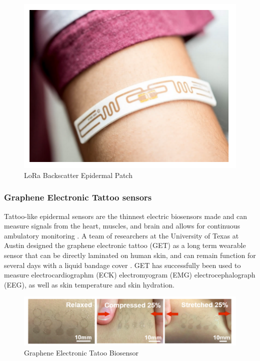 \documentclass[sigconf]{acmart}
\begin{document}
\begin{figure}[!ht]
  \centering\includegraphics[width=\columnwidth]{images/Figure6.pdf}
  \caption{LoRa Backscatter Epidermal Patch \cite{talla17}
  }\label{f:Figure6}
\end{figure}


\subsubsection{Graphene Electronic Tattoo sensors}

Tattoo-like epidermal sensors are the thinnest electric biosensors made and can measure signals from the heart, muscles, and brain and allows for continuous ambulatory monitoring \cite{bourzac17}. A team of researchers at the University of Texas at Austin designed the graphene electronic tattoo (GET) as a long term wearable sensor that can be directly laminated on human skin, and can remain function for several days with a liquid bandage cover \cite{ameri17}. GET has successfully been used to measure  electrocardiographm (ECK) electromyogram (EMG) electrocephalograph (EEG), as well as skin temperature and skin hydration. 

\begin{figure}[!ht]
  \centering\includegraphics[width=\columnwidth]{images/Figure7.pdf}
  \caption{Graphene Electronic Tatoo Biosensor \cite{ameri17}
  }\label{f:Figure7}
\end{figure}
\end{document}
